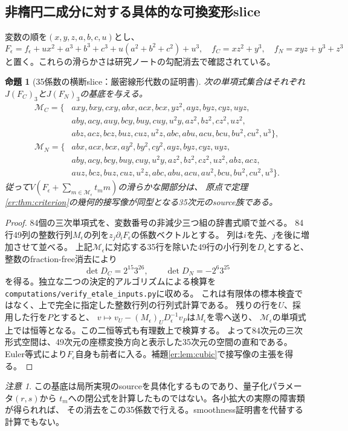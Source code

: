 \documentclass[a4paper,10pt]{ltjsarticle}
\newtheorem{proposition}[theorem]{命題}
\theoremstyle{definition}
\theoremstyle{remark}
\newtheorem{remark}[theorem]{注意}
\begin{document}
\subsection{非楕円二成分に対する具体的な可換変形slice}
変数の順を$(x,y,z,a,b,c,u)$とし、
\[
 F_\epsilon=f_\epsilon+ux^2+a^3+b^3+c^3+u(a^2+b^2+c^2)+u^3,
 \quad f_C=xz^2+y^3,\quad f_N=xyz+y^3+z^3
\]
と置く。これらの滑らかさは研究ノートの勾配消去で確認されている。
\begin{proposition}[35係数の横断slice：厳密線形代数の証明書]\label{er:prop:slice}
次の単項式集合はそれぞれ$J(F_C)_3$と$J(F_N)_3$の基底を与える。
\begin{align*}
\mathcal M_C=\{&axy,bxy,cxy,abx,acx,bcx,yz^2,ayz,byz,cyz,uyz,\\
 &aby,acy,auy,bcy,buy,cuy,u^2y,az^2,bz^2,cz^2,uz^2,\\
 &abz,acz,bcz,buz,cuz,u^2z,abc,abu,acu,bcu,bu^2,cu^2,u^3\},\\
\mathcal M_N=\{&abx,acx,bcx,ay^2,by^2,cy^2,ayz,byz,cyz,uyz,\\
 &aby,acy,bcy,buy,cuy,u^2y,az^2,bz^2,cz^2,uz^2,abz,acz,\\
 &auz,bcz,buz,cuz,u^2z,abc,abu,acu,au^2,bcu,bu^2,cu^2,u^3\}.
\end{align*}
従って$V(F_\epsilon+\sum_{m\in\mathcal M_\epsilon}t_m m)$の滑らかな開部分は、
原点で定理\ref{er:thm:criterion}の幾何的接写像が同型となる35次元のsource族である。
\end{proposition}
\begin{proof}
84個の三次単項式を、変数番号の非減少三つ組の辞書式順で並べる。
84行49列の整数行列$M_\epsilon$の列を$z_j\partial_iF_\epsilon$の係数ベクトルとする。
列は$i$を先、$j$を後に増加させて並べる。
上記$\mathcal M_\epsilon$に対応する35行を除いた49行の小行列を$D_\epsilon$とすると、
整数のfraction-free消去により
\[
 \det D_C=2^{15}3^{26},\qquad \det D_N=-2^6 3^{25}
\]
を得る。独立な二つの決定的アルゴリズムによる検算を
\texttt{computations/verify\_etale\_inputs.py}に収める。
これは有限体の標本検査ではなく、上で完全に指定した整数行列の行列式計算である。
残りの行を$U$、採用した行を$P$とすると、
$v\mapsto v_U-(M_\epsilon)_U D_\epsilon^{-1}v_P$は$M_\epsilon$を零へ送り、
$\mathcal M_\epsilon$の単項式上では恒等となる。この二恒等式も有理数上で検算する。
よって84次元の三次形式空間は、49次元の座標変換方向と表示した35次元の空間の直和である。
Euler等式により$F_\epsilon$自身も前者に入る。補題\ref{er:lem:cubic}で接写像の主張を得る。
\end{proof}

\begin{remark}
この基底は局所実現のsourceを具体化するものであり、量子化パラメータ$(r,s)$から
$t_m$への閉公式を計算したものではない。各小拡大の実際の障害類が得られれば、
その消去をこの35係数で行える。smoothness証明書を代替する計算でもない。
\end{remark}
\end{document}
